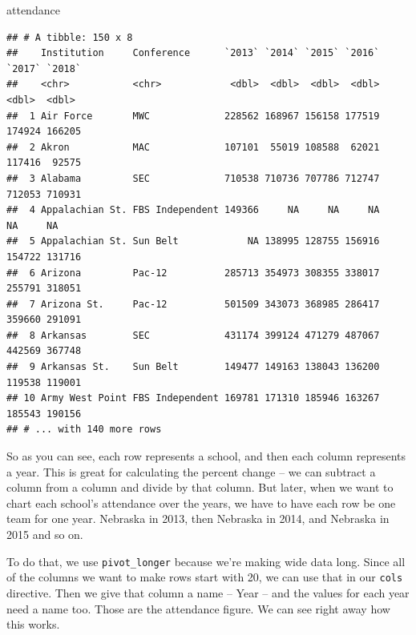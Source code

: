 \documentclass[]{book}
\newenvironment{Shaded}{\begin{snugshade}}{\end{snugshade}}
\newcommand{\DataTypeTok}[1]{\textcolor[rgb]{0.13,0.29,0.53}{#1}}
\newcommand{\KeywordTok}[1]{\textcolor[rgb]{0.13,0.29,0.53}{\textbf{#1}}}
\newcommand{\NormalTok}[1]{#1}
\newcommand{\OperatorTok}[1]{\textcolor[rgb]{0.81,0.36,0.00}{\textbf{#1}}}
\newcommand{\StringTok}[1]{\textcolor[rgb]{0.31,0.60,0.02}{#1}}
\begin{document}
\begin{Shaded}
\begin{Highlighting}[]
\NormalTok{attendance}
\end{Highlighting}
\end{Shaded}

\begin{verbatim}
## # A tibble: 150 x 8
##    Institution     Conference      `2013` `2014` `2015` `2016` `2017` `2018`
##    <chr>           <chr>            <dbl>  <dbl>  <dbl>  <dbl>  <dbl>  <dbl>
##  1 Air Force       MWC             228562 168967 156158 177519 174924 166205
##  2 Akron           MAC             107101  55019 108588  62021 117416  92575
##  3 Alabama         SEC             710538 710736 707786 712747 712053 710931
##  4 Appalachian St. FBS Independent 149366     NA     NA     NA     NA     NA
##  5 Appalachian St. Sun Belt            NA 138995 128755 156916 154722 131716
##  6 Arizona         Pac-12          285713 354973 308355 338017 255791 318051
##  7 Arizona St.     Pac-12          501509 343073 368985 286417 359660 291091
##  8 Arkansas        SEC             431174 399124 471279 487067 442569 367748
##  9 Arkansas St.    Sun Belt        149477 149163 138043 136200 119538 119001
## 10 Army West Point FBS Independent 169781 171310 185946 163267 185543 190156
## # ... with 140 more rows
\end{verbatim}

So as you can see, each row represents a school, and then each column represents a year. This is great for calculating the percent change -- we can subtract a column from a column and divide by that column. But later, when we want to chart each school's attendance over the years, we have to have each row be one team for one year. Nebraska in 2013, then Nebraska in 2014, and Nebraska in 2015 and so on.

To do that, we use \texttt{pivot\_longer} because we're making wide data long. Since all of the columns we want to make rows start with 20, we can use that in our \texttt{cols} directive. Then we give that column a name -- Year -- and the values for each year need a name too. Those are the attendance figure. We can see right away how this works.

\begin{Shaded}
\end{Shaded}
\end{document}
